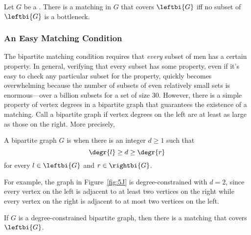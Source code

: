 \begin{theorem}\label{thm:halls}
  Let $G$ be a .  There is a matching in $G$ that
  covers $\leftbi{G}$ iff no subset of $\leftbi{G}$ is a bottleneck.
\end{theorem}

\subsubsection{An Easy Matching Condition}

The bipartite matching condition requires that \emph{every} subset of
men has a certain property.  In general, verifying that every subset
has some property, even if it's easy to check any particular subset
for the property, quickly becomes overwhelming because the number of
subsets of even relatively small sets is enormous---over a billion
subsets for a set of size 30.  However, there is a simple property of
vertex degrees in a bipartite graph that guarantees the existence of a
matching.  Call a bipartite graph 
if vertex degrees on the left are at least as large as those on the
right.  More precisely,

\begin{definition}\label{degree-constrained_def}
A bipartite graph $G$ is  when there is an
integer $d\geq 1$ such that
\begin{equation}\label{lgdgr}
\degr{l} \geq d \geq \degr{r}
\end{equation}
for every $l \in \leftbi{G}$ and $r \in \rightbi{G}$.
\end{definition}

For example, the graph in Figure~\ref{fig:5J} is degree-constrained
with $d=2$, since every vertex on the left is adjacent to at least two
vertices on the right while every vertex on the right is adjacent to
at most two vertices on the left.

\begin{theorem}\label{lem:no_bottleneck_degree_constrained}
  If $G$ is a degree-constrained bipartite graph, then there is a matching
  that covers~$\leftbi{G}$.
\end{theorem}

